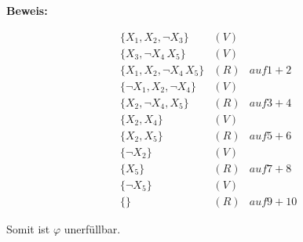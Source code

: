 \documentclass[12pt,a4paper]{scrartcl}
\begin{document}
\noindent
\textbf{Beweis: }

\begin{align}
  & \{X_1, X_2, \neg X_3\} & (V)\\
  & \{X_3, \neg X_4\, X_5\} & (V)\\
  & \{X_1, X_2, \neg X_4\, X_5\} & (R) & auf 1 + 2\\
  & \{\neg X_1, X_2, \neg X_4\} & (V)\\
  & \{X_2, \neg X_4, X_5\} & (R) & auf 3 + 4\\
  & \{X_2, X_4\} & (V)\\
  & \{X_2, X_5\} & (R) & auf 5 + 6\\
  & \{\neg X_2\} & (V)\\
  & \{X_5\} & (R) & auf 7 + 8\\
  & \{\neg X_5\} & (V)\\
  & \{\} & (R) & auf 9 + 10
\end{align}

Somit ist $\varphi$ unerfüllbar.
\end{document}
